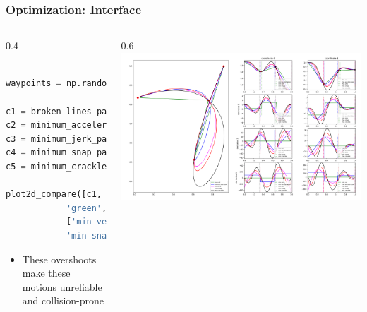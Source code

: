 \begin{frame}[fragile]
	\frametitle{Optimization: Interface}
	\begin{columns}
		\begin{column}{0.4\textwidth}
			\begin{lstlisting}[language=python]

waypoints = np.random.rand(4, 2)

c1 = broken_lines_path(waypoints)
c2 = minimum_acceleration_path(waypoints)
c3 = minimum_jerk_path(waypoints)
c4 = minimum_snap_path(waypoints)
c5 = minimum_crackle_path(waypoints)

plot2d_compare([c1, c2, c3, c4, c5], [
            'green', 'blue', 'magenta', 'red', 'black'],
            ['min vel', 'min acceleration', 'min jerk',
            'min snap', 'min crackle'])

    \end{lstlisting}
			\begin{itemize}
				\item These overshoots make these motions unreliable and collision-prone
			\end{itemize}
		\end{column}
		\begin{column}{0.6\textwidth}
			\includegraphics[width=\textwidth]{./images/comparison.png}
		\end{column}
	\end{columns}

\end{frame}
